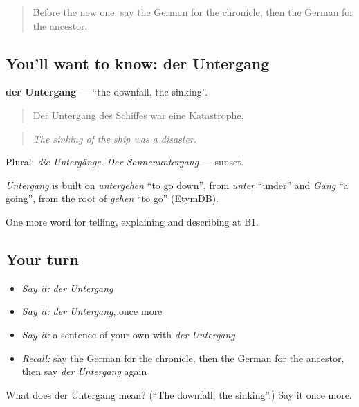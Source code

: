 \label{lesson:GE-C320-untergang}



\begin{quote}
Before the new one: say the German for the chronicle, then the German for the ancestor.
\end{quote}

\subsection*{You'll want to know: der Untergang}
\textbf{der Untergang} — \textquotedblleft{}the downfall, the sinking\textquotedblright{}.

\begin{quote}
Der Untergang des Schiffes war eine Katastrophe.
\end{quote}

\begin{quote}
\emph{The sinking of the ship was a disaster.}
\end{quote}

Plural: \emph{die Untergänge}. \emph{Der Sonnenuntergang} — sunset.

\begin{cousinweb}
\emph{Untergang} is built on \emph{untergehen} \textquotedblleft{}to go down\textquotedblright{}, from \emph{unter} \textquotedblleft{}under\textquotedblright{} and \emph{Gang} \textquotedblleft{}a going\textquotedblright{}, from the root of \emph{gehen} \textquotedblleft{}to go\textquotedblright{} (EtymDB).
\end{cousinweb}

\begin{grammarlens}[title={What you've built}]
One more word for telling, explaining and describing at B1.
\end{grammarlens}

\subsection*{Your turn}
\begin{itemize}
\raggedright
  \item \emph{Say it:} \emph{der Untergang}
  \item \emph{Say it:} \emph{der Untergang}, once more
  \item \emph{Say it:} a sentence of your own with \emph{der Untergang}
  \item \emph{Recall:} say the German for the chronicle, then the German for the ancestor, then say \emph{der Untergang} again
\end{itemize}

\begin{tcolorbox}[breakable,colback=teal!4,colframe=teal!35!black,title={Before you move on}]
What does der Untergang mean? (\textquotedblleft{}The downfall, the sinking\textquotedblright{}.) Say it once more.
\end{tcolorbox}
